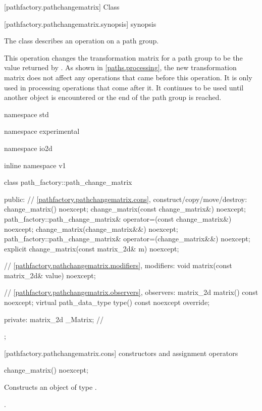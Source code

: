  [pathfactory.pathchangematrix] {Class }

 [pathfactory.pathchangematrix.synopsis] { synopsis}

\pnum
{}
The class  describes an operation on a path group.

\pnum
This operation changes the transformation matrix for a path group to be the value returned by . As shown in \ref{paths.processing}, the new transformation matrix does not affect any operations that came before this operation. It is only used in processing operations that come after it. It continues to be used until another  object is encountered or the end of the path group is reached.

\begin{codeblock}
namespace std { namespace experimental { namespace io2d { inline namespace v1 {
  class path_factory::path_change_matrix {
  public:
    // \ref{pathfactory.pathchangematrix.cons}, construct/copy/move/destroy:
    change_matrix() noexcept;
    change_matrix(const change_matrix&) noexcept;
    path_factory::path_change_matrix& operator=(const change_matrix&) noexcept;
    change_matrix(change_matrix&&) noexcept;
    path_factory::path_change_matrix& operator=(change_matrix&&) noexcept;
    explicit change_matrix(const matrix_2d& m) noexcept;

    // \ref{pathfactory.pathchangematrix.modifiers}, modifiers:
    void matrix(const matrix_2d& value) noexcept;

    // \ref{pathfactory.pathchangematrix.observers}, observers:
    matrix_2d matrix() const noexcept;
    virtual path_data_type type() const noexcept override;
    
  private:
    matrix_2d _Matrix; // \expos
  };
} } } }
\end{codeblock}

 [pathfactory.pathchangematrix.cons] { constructors and assignment operators}

\begin{itemdecl}
    change_matrix() noexcept;
\end{itemdecl}
\begin{itemdescr}
	\pnum
	\effects
	Constructs an object of type .
	
	\pnum
	\postconditions
	.
\end{itemdescr}

